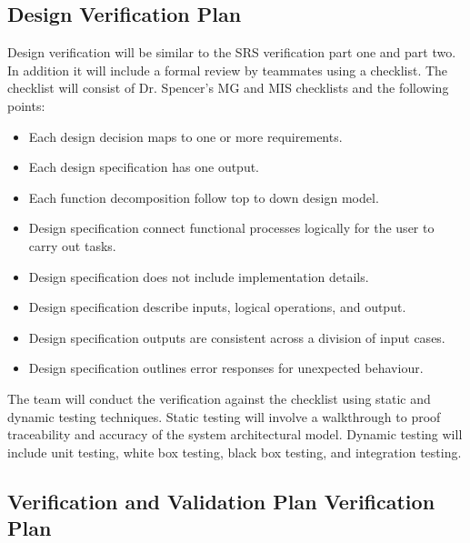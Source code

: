 \documentclass[12pt, titlepage]{article}
\begin{document}
\subsection{Design Verification Plan}

Design verification will be similar to the SRS verification part one and
part two. In addition it will include a formal review by teammates using
a checklist. The checklist will consist of Dr. Spencer's MG and MIS checklists and the following points:
\begin{itemize}
    \item Each design decision maps to one or more requirements. 
    \item Each design specification has one output. 
    \item Each function decomposition follow top to down design model.
    \item Design specification connect functional processes logically for the user to carry out tasks.
    \item Design specification does not include implementation details.
    \item Design specification describe inputs, logical operations, and output. 
    \item Design specification outputs are consistent across a division of input cases.
    \item Design specification outlines error responses for unexpected behaviour. 
\end{itemize}

The team will conduct the verification against the checklist using 
static and dynamic testing techniques. Static testing will involve 
a walkthrough to proof traceability and accuracy of the system 
architectural model. Dynamic testing will include unit testing, white box testing, black box testing, and integration testing.




\subsection{Verification and Validation Plan Verification Plan}
\end{document}

